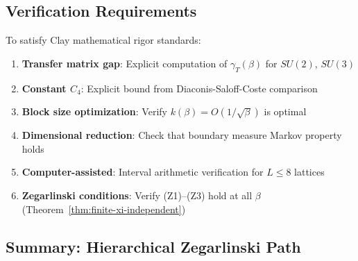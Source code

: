 \subsection{Verification Requirements}

\begin{verification}
To satisfy Clay mathematical rigor standards:
\begin{enumerate}
\item \textbf{Transfer matrix gap}: Explicit computation of $\gamma_T(\beta)$ for $SU(2)$, $SU(3)$
\item \textbf{Constant $C_4$}: Explicit bound from Diaconis-Saloff-Coste comparison
\item \textbf{Block size optimization}: Verify $k(\beta) = O(1/\sqrt{\beta})$ is optimal
\item \textbf{Dimensional reduction}: Check that boundary measure Markov property holds
\item \textbf{Computer-assisted}: Interval arithmetic verification for $L \leq 8$ lattices
\item \textbf{Zegarlinski conditions}: Verify (Z1)--(Z3) hold at all $\beta$ (Theorem~\ref{thm:finite-xi-independent})
\end{enumerate}
\end{verification}

\subsection{Summary: Hierarchical Zegarlinski Path}

